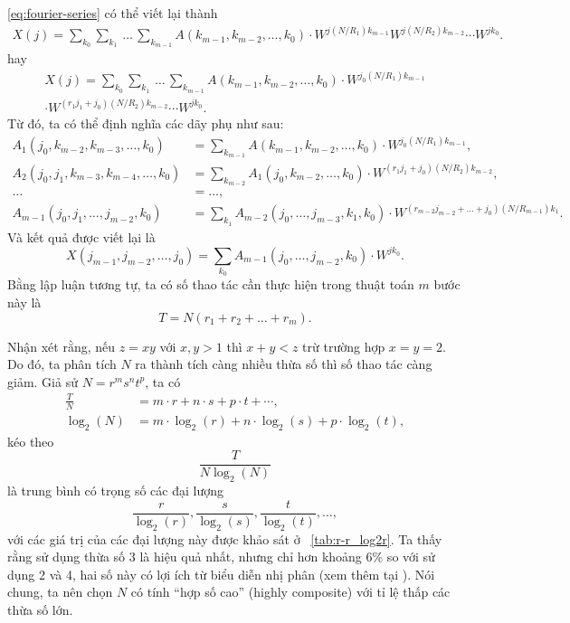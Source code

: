 \eqref{eq:fourier-series} có thể viết lại thành \begin{multline}
  X(j) = \sum_{k_0}\sum_{k_1}\, \dots\, \sum_{k_{m - 1}}A(k_{m - 1}, k_{m - 2},
  \dots, k_0) \cdot W^{j (N / R_1) k_{m - 1}} W^{j (N / R_2)
  k_{m - 2}}\dotsm W^{j k_0}.
\end{multline} hay \begin{multline}
  X(j) = \sum_{k_0}\sum_{k_1}\, \dots\, \sum_{k_{m - 1}}A(k_{m - 1}, k_{m - 2},
  \dots, k_0)\cdot W^{j_0 (N / R_1) k_{m - 1}} \\
  \cdot W^{(r_1j_1 + j_0) (N / R_2) k_{m - 2}} \dotsm W^{j k_0}.
\end{multline} Từ đó, ta có thể định nghĩa các dãy phụ như sau: \begin{equation}
  \begin{aligned}
    A_1(j_0, k_{m - 2}, k_{m - 3}, \dots, k_0) &= \sum_{k_{m - 1}} A(k_{m - 1},
    k_{m - 2}, \dots, k_0) \cdot W^{j_0 (N / R_1) k_{m - 1}}, \\
    A_2(j_0, j_1, k_{m - 3}, k_{m - 4}, \dots, k_0) &= \sum_{k_{m - 2}}
    A_1(j_0, k_{m - 2}, \dots, k_0) \cdot W^{(r_1j_1 + j_0) (N / R_2) k_{m -
    2}}, \\
    \dots &= \dots, \\
    A_{m - 1}(j_0, j_1, \dots, j_{m - 2}, k_0) &= \sum_{k_1} A_{m - 2}(j_0,
    \dots, j_{m - 3}, k_1, k_0) \cdot W^{(r_{m - 2}j_{m - 2} + \dots + j_0) (N
    / R_{m - 1}) k_1}.
  \end{aligned}
\end{equation} Và kết quả được viết lại là \begin{equation}
  X(j_{m - 1}, j_{m - 2}, \dots, j_0) = \sum_{k_0} A_{m - 1}(j_0, \dots, j_{m -
  2}, k_0) \cdot W^{j k_0}.
\end{equation} Bằng lập luận tương tự, ta có số thao tác cần thực hiện trong
thuật toán $m$ bước này là \begin{equation}
  T = N(r_1 + r_2 + \dots + r_m).
\end{equation}

Nhận xét rằng, nếu $z = xy$ với $x, y > 1$ thì $x + y < z$ trừ trường hợp $x =
y = 2$. Do đó, ta phân tích $N$ ra thành tích càng nhiều thừa số thì số thao
tác càng giảm. Giả sử $N = r^ms^nt^p$, ta có \begin{align}
  \frac{T}{N} &= m\cdot r + n \cdot s + p \cdot t + \dotsb, \\
  \log_2(N) &= m\cdot \log_2(r) + n \cdot \log_2(s) + p \cdot \log_2(t),
\end{align}kéo theo \begin{equation*}
  \frac{T}{N \log_2(N)}
\end{equation*} là trung bình có trọng số các đại lượng \begin{equation*}
  \frac{r}{\log_2(r)}, \frac{s}{\log_2(s)}, \frac{t}{\log_2(t)}, \dotsc,
\end{equation*} với các giá trị của các đại lượng này được khảo sát ở
\tablename~\ref{tab:r-r_log2r}. Ta thấy rằng sử dụng thừa số $3$ là hiệu quả
nhất, nhưng chỉ hơn khoảng 6\% so với sử dụng 2 và 4, hai số này có lợi ích
từ biểu diễn nhị phân (xem thêm tại \cite{cooley1965algorithm}). Nói chung, ta
nên chọn $N$ có tính ``hợp số cao'' (highly composite) với tỉ lệ thấp các thừa
số lớn.

